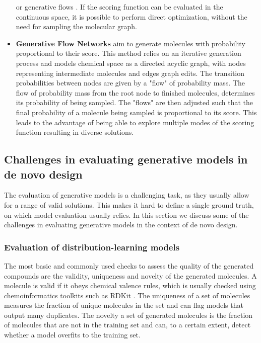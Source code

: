 \begin{itemize}
            or generative flows \citep{madhawaGraphNVPInvertibleFlow2019}. If the scoring function
            can be evaluated in the continuous space, it is possible to perform direct optimization,
            without the need for sampling the molecular graph.
      \item \textbf{Generative Flow Networks} \citep{bengioFlowNetworkBased2021} aim to generate
            molecules with probability proportional to their score. This method relies on an
            iterative generation process and models chemical space as a directed acyclic graph, with
            nodes representing intermediate molecules and edges graph edits. The transition probabilities
            between nodes are given by a "flow" of probability mass. The flow of probability mass
            from the root node to finished molecules, determines its probability of being sampled.
            The "flows" are then adjusted such that the final probability of a molecule being sampled is
            proportional to its score. This leads to the advantage of being able to explore
            multiple modes of the scoring function resulting in diverse solutions.
\end{itemize}

\subsection{Challenges in evaluating generative models in de novo design}
The evaluation of generative models is a challenging task, as they usually allow for a
range of valid solutions. This makes it hard to define a single ground truth, on which model
evaluation usually relies. In this section we discuss some of the challenges in evaluating
generative models in the context of de novo design.

\subsubsection{Evaluation of distribution-learning models}
The most basic and commonly used checks to assess the quality of the generated compounds are the
validity, uniqueness and novelty of the generated molecules. A molecule is valid if it obeys
chemical valence rules, which is usually checked using chemoinformatics toolkits such as RDKit
\citep{landrumRDKitOpensourceCheminformatics2006}. The uniqueness of a set of molecules measures the
fraction of unique molecules in the set and can flag models that output many duplicates. The novelty
a set of generated molecules is the fraction of molecules that are not in the training set and can,
to a certain extent, detect whether a model overfits to the training set.

